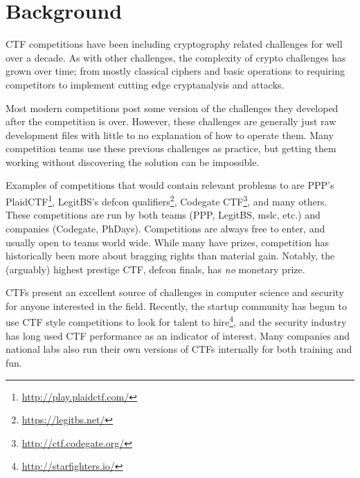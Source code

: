 \section{Background}
\label{sec:background}
CTF competitions have been including cryptography related challenges
for well over a decade. As with other challenges, the complexity of
crypto challenges has grown over time; from mostly classical ciphers
and basic operations to requiring competitors to implement cutting
edge cryptanalysis and attacks.

Most modern competitions post some version of the challenges they
developed after the competition is over. However, these challenges are
generally just raw development files with little to no explanation of
how to operate them. Many competition teams use these previous
challenges as practice, but getting them working without discovering
the solution can be impossible.

Examples of competitions that would contain relevant problems to
\cvm{} are PPP's PlaidCTF\footnote{\url{http://play.plaidctf.com/}},
LegitBS's defcon qualifiers\footnote{\url{https://legitbs.net/}},
Codegate CTF\footnote{\url{http://ctf.codegate.org/}}, and many
others. These competitions are run by both teams (PPP, LegitBS, mslc,
etc.) and companies (Codegate, PhDays). Competitions are always free
to enter, and usually open to teams world wide. While many have
prizes, competition has historically been more about bragging rights
than material gain. Notably, the (arguably) highest prestige CTF,
defcon finals, has \textit{no} monetary prize.

CTFs present an excellent source of challenges in computer science and
security for anyone interested in the field. Recently, the startup
community has begun to use CTF style competitions to look for talent
to hire\footnote{\url{http://starfighters.io/}}, and the security
industry has long used CTF performance as an indicator of
interest. Many companies and national labs also run their own versions
of CTFs internally for both training and fun.
